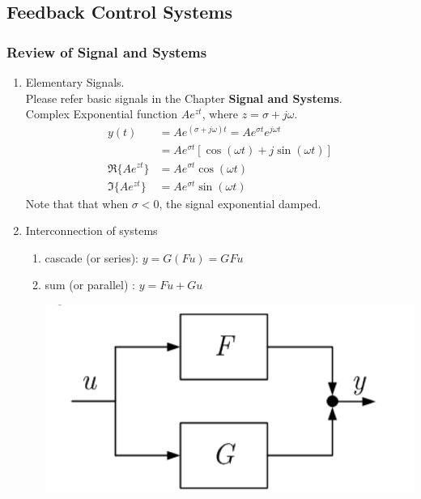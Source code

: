 \documentclass{article}
\begin{document}
\subsection{Feedback Control Systems}
\subsubsection{Review of Signal and Systems}
\begin{enumerate}
    \item Elementary Signals. \\
    Please refer basic signals in the Chapter \textbf{Signal and Systems}. \\
    Complex Exponential function $Ae^{zt}$, where $z = \sigma + j\omega$.
    \begin{align*}
        y(t) &= Ae^{(\sigma+j\omega)t} = Ae^{\sigma t}e^{j\omega t} \\
        &= Ae^{\sigma t}[\cos(\omega t) + j\sin(\omega t)] \\
        \Re\{Ae^{zt}\} &= Ae^{\sigma t}\cos(\omega t) \\
        \Im\{Ae^{zt}\} &= Ae^{\sigma t}\sin(\omega t)
    \end{align*}
    Note that that when $\sigma < 0$, the signal exponential damped.
    \item Interconnection of systems
    \begin{enumerate}
        \item cascade (or series): $\displaystyle y = G(Fu) = GFu$ \\
        \begin{center}
        \end{center}
        \item sum (or parallel) : $\displaystyle y = Fu + Gu$
        \begin{center}
            \includegraphics[width=0.5\linewidth]{image/sum.png}

\end{center}
\end{enumerate}
\end{enumerate}
\end{document}
